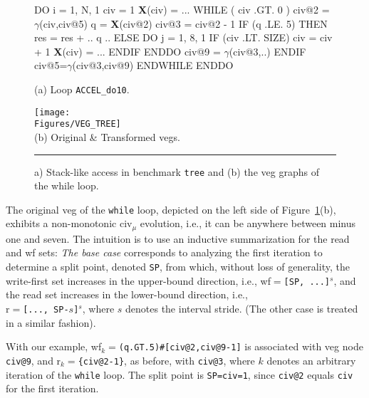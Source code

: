 \documentclass{sig-alternate}
\newcommand{\mymath}[1]{$ #1 $}
\newcommand{\Figures}[1]{../Figures/}
\begin{document}
\begin{figure}
\begin{minipage}{0.4\columnwidth}
\begin{colorcode}
DO i = 1, N, 1
 civ = 1
 {\bf{}X}(civ) = ...
 WHILE ( civ .GT. 0 )
  civ@2 = \mymath{\gamma}(civ,civ@5)
  q = {\bf X}(civ@2)
  civ@3 = civ@2 - 1
  IF (q .LE. 5) THEN
   res = res + .. q ..
  ELSE
   DO j = 1, 8, 1
    IF (civ .LT. SIZE) 
      civ = civ + 1
      {\bf{}X}(civ) = ...
   ENDIF ENDDO
   civ@9 = \mymath{\gamma}(civ@3,..)
  ENDIF
  civ@5=\mymath{\gamma}(civ@3,civ@9)
ENDWHILE ENDDO   
\end{colorcode}
\vspace{-1ex}
(a) Loop {\tt ACCEL\_do10}.
\end{minipage}
\begin{minipage}{0.56\columnwidth}
\texttt{[image: \\Figures/VEG\_TREE]}\\
(b) Original \& Transformed {\sc veg}s.
\end{minipage}
\hrule
\caption{a) Stack-like access in benchmark {\tt tree} and (b) the {\sc veg} graphs of the while loop.}
\vspace{-1ex}
\label{fig:Tree} %
\end{figure}


The original {\sc veg} of the {\tt while} loop, depicted on the left 
side of Figure~\ref{fig:Tree}(b), exhibits a non-monotonic {\sc civ}$_\mu$
evolution, i.e., it can be anywhere between minus one and seven.
%
The intuition is to use an inductive summarization for the read and {\sc wf} sets:
{\em The base case} corresponds to analyzing the first iteration to determine a split point, 
denoted {\tt SP}, from which, without loss of generality, the write-first set increases in the 
upper-bound direction, i.e., {\sc wf}$=${\tt[SP, ...]$^s$}, and the read set increases in the lower-bound
direction, i.e., \\
{\sc r}$=${\tt [..., SP-$s$]$^s$}, where $s$ denotes the interval stride.
(The other case is treated in a similar fashion).

With our example, {\sc wf}$_k=${\tt (q.GT.5)\#[civ@2,civ@9-1]}
is associated with {\sc veg} node {\tt civ@9}, and 
{\sc r}$_k=${\tt \{civ@2-1\}}, as before, with {\tt civ@3}, 
where $k$ denotes an arbitrary iteration of the {\tt while} loop.
The split point is {\tt SP=civ=1}, since {\tt civ@2} equals {\tt civ} 
for the first iteration.


\end{document}

